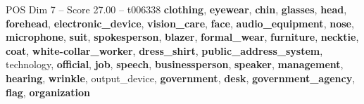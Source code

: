 \begin{textsample}{POS Dim 7 – Score 27.00 – t006338}  \label{ex:f7_pos_030}
\textbf{clothing}, \textbf{eyewear}, \textbf{chin}, \textbf{glasses}, \textbf{head}, \textbf{forehead}, \textbf{electronic\_device}, \textbf{vision\_care}, \textbf{face}, \textbf{audio\_equipment}, \textbf{nose}, \textbf{microphone}, \textbf{suit}, \textbf{spokesperson}, \textbf{blazer}, \textbf{formal\_wear}, \textbf{furniture}, \textbf{necktie}, \textbf{coat}, \textbf{white-collar\_worker}, \textbf{dress\_shirt}, \textbf{public\_address\_system}, technology, \textbf{official}, \textbf{job}, \textbf{speech}, \textbf{businessperson}, \textbf{speaker}, \textbf{management}, \textbf{hearing}, \textbf{wrinkle}, output\_device, \textbf{government}, \textbf{desk}, \textbf{government\_agency}, \textbf{flag}, \textbf{organization}

\end{textsample}

